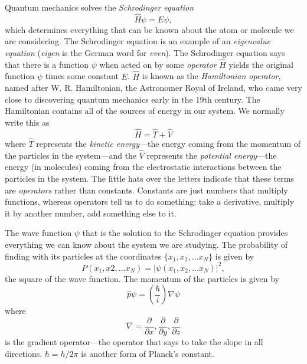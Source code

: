 Quantum mechanics solves the \emph{Schrodinger equation}
\begin{equation}
	\hat{H}\psi=E\psi,
\label{simple-schrod-eq}
\end{equation}
which determines everything that can be known about the
atom or molecule we are considering. The Schrodinger equation is an
example of an \emph{eigenvalue equation} (\emph{eigen} is the German
word for \emph{even}). The Schrodinger equation says that there is a
function $\psi$ when acted on by some \emph{operator} $\hat{H}$ yields
the original function $\psi$ times some constant $E$. $\hat{H}$ is
known as the \emph{Hamiltonian operator}, named after
W. R. Hamiltonian, the Astronomer Royal of Ireland, who came very
close to discovering quantum mechanics early in the 19th century. The
Hamiltonian contains all of the sources of energy in our system. We
normally write this as
\begin{equation}
	\hat{H} = \hat{T} + \hat{V}
\end{equation}
where $\hat{T}$ represents the \emph{kinetic energy}---the
energy coming from the momentum of the particles in the system---and
the $\hat{V}$ represents the \emph{potential energy}---the energy (in
molecules) coming from the electrostatic interactions between the
particles in the system. The little hats over the letters indicate
that these terms are \emph{operators} rather than constants. Constants
are just numbers that multiply functions, whereas operators tell us to
do something: take a derivative, multiply it by another number, add
something else to it.

The wave function $\psi$ that is the solution to the Schrodinger
equation provides everything we can know about the system we are
studying. The probability of finding with its particles at 
the coordinates $\{x_1, x_2,  \dots x_N\}$ is given by 
\begin{equation}
	P(x_1,x2,\dots x_N) = |\psi(x_1,x_2,\dots x_N)|^2,
\end{equation}
the square of the wave function. The momentum of the
particles is given by 
\begin{equation}
	\hat{p}\psi = \left(\frac{\hbar}{i}\right)\nabla\psi
\label{momentum}
\end{equation}
where 
\begin{equation}
	\nabla = \frac{\partial}{\partial x},
		\frac{\partial}{\partial y},
		\frac{\partial}{\partial z}
\end{equation}
is the gradient operator---the operator that says to take
the slope in all directions. $\hbar=h/2\pi$ is another form of
Planck's constant.

